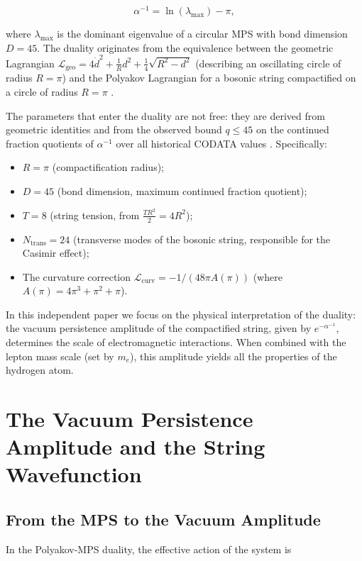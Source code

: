 \documentclass[12pt]{article}
\begin{document}
\[
\boxed{\alpha^{-1} = \ln(\lambda_{\max}) - \pi}, \tag{3}
\]

where \(\lambda_{\max}\) is the dominant eigenvalue of a circular MPS with bond dimension \(D = 45\). The duality originates from the equivalence between the geometric Lagrangian \(\mathcal{L}_{\text{geo}} = 4\dot{d}^2 + \frac{1}{R}d^2 + \frac{1}{4}\sqrt{R^2-d^2}\) (describing an oscillating circle of radius \(R = \pi\)) and the Polyakov Lagrangian for a bosonic string compactified on a circle of radius \(R = \pi\) \cite{polyakov1981, green2012, polchinski1998}.

The parameters that enter the duality are not free: they are derived from geometric identities and from the observed bound \(q \le 45\) on the continued fraction quotients of \(\alpha^{-1}\) over all historical CODATA values \cite{codata2022}. Specifically:
\begin{itemize}
    \item \(R = \pi\) (compactification radius);
    \item \(D = 45\) (bond dimension, maximum continued fraction quotient);
    \item \(T = 8\) (string tension, from \(\frac{T R^2}{2} = 4R^2\));
    \item \(N_{\text{trans}} = 24\) (transverse modes of the bosonic string, responsible for the Casimir effect);
    \item The curvature correction \(\mathcal{L}_{\text{curv}} = -1/(48\pi A(\pi))\) (where \(A(\pi)=4\pi^3+\pi^2+\pi\)).
\end{itemize}

In this independent paper we focus on the physical interpretation of the duality: the vacuum persistence amplitude of the compactified string, given by \(e^{-\alpha^{-1}}\), determines the scale of electromagnetic interactions. When combined with the lepton mass scale (set by \(m_e\)), this amplitude yields all the properties of the hydrogen atom.

\section{The Vacuum Persistence Amplitude and the String Wavefunction}

\subsection{From the MPS to the Vacuum Amplitude}

In the Polyakov-MPS duality, the effective action of the system is
\end{document}
